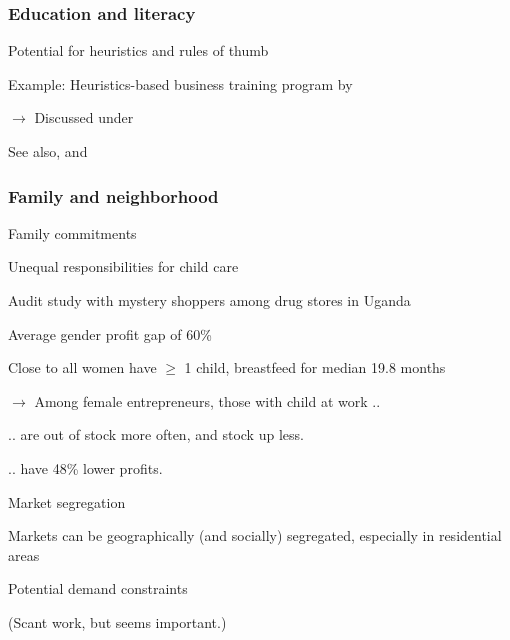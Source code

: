 \documentclass[hideothersubsections, usenames,dvipsnames,11pt]{beamer}
\newenvironment{itemize_2pt}{\itemize\addtolength{\itemsep}{2pt}}{\enditemize}
\begin{document}
\begin{frame}
\frametitle{Education and literacy}

Potential for heuristics and rules of thumb
\begin{itemize_2pt}
	\item Example: Heuristics-based business training program by \citet{Drexler2014}
	\item[] $\rightarrow$ Discussed under \hyperlink{Drexler_thumb}{}
	\item See also, \citet{Cole2018} and \citet{Arraiz2019}
\end{itemize_2pt}
\end{frame}


\begin{frame}
\frametitle{Family and neighborhood}

Family commitments
\begin{itemize_2pt}
	\item \textcolor{bdf}{Unequal responsibilities for child care} \citep[see, e.g.,][]{Delecourt2021}
	\begin{itemize_2pt}
		\item Audit study with mystery shoppers among drug stores in Uganda
		\item Average gender profit gap of 60\%
		\item Close to all women have $\geq$ 1 child, breastfeed for median 19.8 months
		\item[] $\rightarrow$ Among female entrepreneurs, those with child at work ..
		\begin{itemize_2pt}
			\item .. are \textcolor{bdf}{out of stock} more often, and stock up less.
			\item .. have \textcolor{bdf}{48\% lower profits}.
		\end{itemize_2pt}
	\end{itemize_2pt}
\end{itemize_2pt}

\pause
\vspace{1.0em}

Market segregation
\begin{itemize_2pt}
	\item Markets can be geographically (and socially) segregated, especially in residential areas
	\begin{itemize_2pt}
		\item Potential \textcolor{bdf}{demand constraints} \citep[in the spirit of][, for women in Ghana]{Hardy2020}
		\item (Scant work, but seems important.)
	\end{itemize_2pt}
\end{itemize_2pt}
\end{frame}
\end{document}
